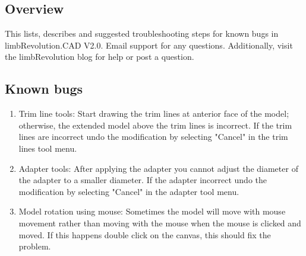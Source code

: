 \documentclass[twoside,a4paper]{refrep}
\begin{document}
	\subsection{Overview}
	This lists, describes and suggested troubleshooting steps for known bugs in limbRevolution.CAD V2.0. Email support for any questions. Additionally, visit the limbRevolution blog for help or post a question.
	\subsection{Known bugs}
	\begin{enumerate}
	
	\item
	Trim line tools: Start drawing the trim lines at anterior face of the model; otherwise, the extended model above the trim lines is incorrect. If the trim lines are incorrect undo the modification by selecting "Cancel" in the trim lines tool menu.
	
	\item
	Adapter tools: After applying the adapter you cannot adjust the diameter of the adapter to a smaller diameter. If the adapter incorrect undo the modification by selecting "Cancel" in the adapter tool menu.
	
	\item
	Model rotation using mouse: Sometimes the model will move with mouse movement rather than moving with the mouse when the mouse is clicked and moved. If this happens double click on the canvas, this should fix the problem.
	\end{enumerate}
	
%	
%		
%		
%		
%		
%		
\end{document}
